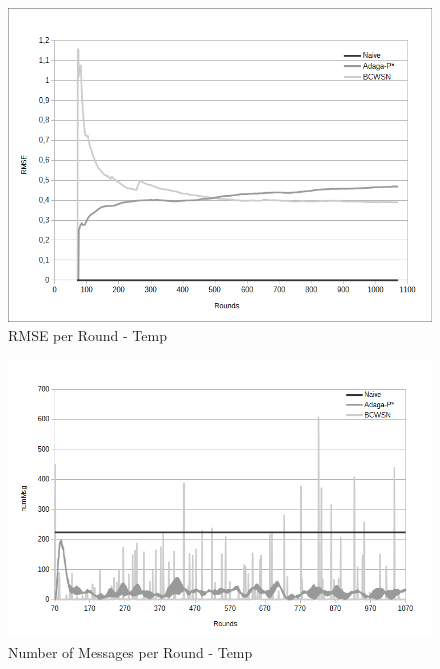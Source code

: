 \documentclass{acm_proc_article-sp}
\begin{document}
\begin{figure}[!htb]
\begin{center}
	\includegraphics[scale=0.40]{BCWSN-RMSExRound-PB.png}
    \caption{RMSE per Round - Temp}
    \label{fig:rmse}
\end{center}
\end{figure}

\begin{figure}[!htb]
\begin{center}
	\includegraphics[scale=0.37]{BCWSN-NumMsgPerRoundxRound-PB.png}
    \caption{Number of Messages per Round - Temp}
    \label{fig:num-msg}
\end{center}
\end{figure}
\vspace*{-.3cm}
\end{document}
